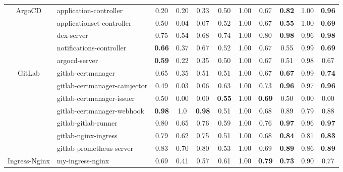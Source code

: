 \documentclass[conference]{IEEEtran}
\theoremstyle{definition}
\begin{document}
\begin{table}[!htb]
{\begin{tabular}{clccc|ccc|ccc}
        \multirow{5}{*}{ArgoCD} 
        & application-controller & 0.20 & 0.20 & 0.33 & 0.50 & 1.00 & 0.67 & \cellcolor{gray!32}\textbf{0.82} & 1.00 & \cellcolor{gray!46}\textbf{0.96} \\ 
        & applicationset-controller & 0.50 & 0.04 & 0.07 & 0.52 & 1.00 & 0.67 & \cellcolor{gray!5}\textbf{0.55} & 1.00 & \cellcolor{gray!19}\textbf{0.69} \\ 
        & dex-server & 0.75 & 0.54 & 0.68 & 0.74 & 1.00 & 0.80 & \cellcolor{gray!48}\textbf{0.98} & 0.96 & \cellcolor{gray!48}\textbf{0.98} \\ 
        & notifications-controller & \cellcolor{gray!16}\textbf{0.66} & 0.37 & 0.67 & 0.52 & 1.00 & 0.67 & 0.55 & 0.99 & \cellcolor{gray!19}\textbf{0.69} \\ 
        & argocd-server & \cellcolor{gray!9}\textbf{0.59}  & 0.22 & 0.35 & 0.50 & 1.00 & 0.67 & 0.51 & 0.98 & 0.67 \\ \hline
        
        \multirow{7}{*}{GitLab} 
        & gitlab-certmanager & 0.65 & 0.35 & 0.51 & 0.51 & 1.00 & 0.67 & \cellcolor{gray!17}\textbf{0.67} & 0.99 & \cellcolor{gray!24}\textbf{0.74} \\ 
        & gitlab-certmanager-cainjector & 0.49 & 0.03 & 0.06 & 0.63 & 1.00 & 0.73 & \cellcolor{gray!46}\textbf{0.96} & 0.97 & \cellcolor{gray!46}\textbf{0.96} \\ 
        & gitlab-certmanager-issuer & 0.50 & 0.00 & 0.00 & \cellcolor{gray!10}\textbf{0.55} & 1.00 & \cellcolor{gray!19}\textbf{0.69} & 0.50 & 0.00 & 0.00 \\ 
        & gitlab-certmanager-webhook & \cellcolor{gray!48}\textbf{0.98} & 1.0&\cellcolor{gray!48}\textbf{0.98} & 0.51 & 1.00 & 0.68 & 0.89 & 0.79 & 0.88 \\ 
        & gitlab-gitlab-runner &0.80 &0.65 &0.76 & 0.59 & 1.00 & 0.76 & \cellcolor{gray!47}\textbf{0.97} & 0.96 & \cellcolor{gray!47}\textbf{0.97} \\ 
        & gitlab-nginx-ingress &0.79&0.62&0.75 & 0.51 & 1.00 & 0.68 & \cellcolor{gray!34}\textbf{0.84} & 0.81 & \cellcolor{gray!33}\textbf{0.83} \\ 
        & gitlab-prometheus-server & 0.83&0.70 & 0.80 & 0.53 & 1.00 & 0.69 & \cellcolor{gray!39}\textbf{0.89} & 0.86 &\cellcolor{gray!39}\textbf{0.89} \\ \hline
        
        \multirow{1}{*}{Ingress-Nginx} 
        & my-ingress-nginx & 0.69 & 0.41 & 0.57 & 0.61 & 1.00 & \cellcolor{gray!29}\textbf{0.79} & \cellcolor{gray!23}\textbf{0.73} & 0.90 & 0.77 \\ \hline
        

\end{tabular}}
\end{table}
\end{document}
